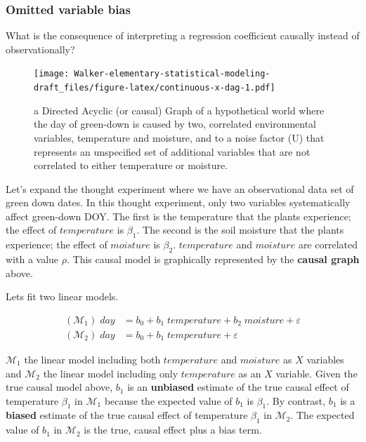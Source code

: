 \documentclass[]{book}
\begin{document}
\hypertarget{omitted-variable-bias}{%
\subsubsection{Omitted variable bias}\label{omitted-variable-bias}}

What is the consequence of interpreting a regression coefficient causally instead of observationally?

\begin{figure}
\centering
\texttt{[image: Walker-elementary-statistical-modeling-draft\_files/figure-latex/continuous-x-dag-1.pdf]}
\caption{\label{fig:continuous-x-dag}a Directed Acyclic (or causal) Graph of a hypothetical world where the day of green-down is caused by two, correlated environmental variables, temperature and moisture, and to a noise factor (U) that represents an unspecified set of additional variables that are not correlated to either temperature or moisture.}
\end{figure}

Let's expand the thought experiment where we have an observational data set of green down dates. In this thought experiment, only two variables systematically affect green-down DOY. The first is the temperature that the plants experience; the effect of \(temperature\) is \(\beta_1\). The second is the soil moisture that the plants experience; the effect of \(moisture\) is \(\beta_2\). \(temperature\) and \(moisture\) are correlated with a value \(\rho\). This causal model is graphically represented by the \textbf{causal graph} above.

Lets fit two linear models.

\begin{align}
(\mathcal{M}_1)\; day &= b_0 + b_1 \; temperature + b_2 \; moisture + \varepsilon\\
(\mathcal{M}_2)\; day &= b_0 + b_1 \; temperature + \varepsilon
\end{align}

\(\mathcal{M}_1\) the linear model including both \(temperature\) and \(moisture\) as \(X\) variables and \(\mathcal{M}_2\) the linear model including only \(temperature\) as an \(X\) variable. Given the true causal model above, \(b_1\) is an \textbf{unbiased} estimate of the true causal effect of temperature \(\beta_1\) in \(\mathcal{M}_1\) because the expected value of \(b_1\) is \(\beta_1\). By contrast, \(b_1\) is a \textbf{biased} estimate of the true causal effect of temperature \(\beta_1\) in \(\mathcal{M}_2\). The expected value of \(b_1\) in \(\mathcal{M}_2\) is the true, causal effect plus a bias term.
\end{document}
